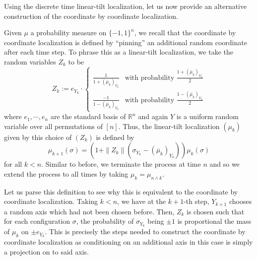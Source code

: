 Using the discrete time linear-tilt localization, let us now provide an alternative construction of the 
coordinate by coordinate localization.

Given \(\mu\) a probability measure on \(\{-1, 1\}^n\), we recall that the coordinate by coordinate 
localization is defined by ``pinning'' an additional random coordinate after each time step. To phrase 
this as a linear-tilt localization, we take the random variables \(Z_k\) to be
\begin{equation}
  Z_k := e_{Y_k} \cdot
    \begin{cases}
      \frac{1}{1 + (\bar{\mu}_k)_{Y_k}} & \text{with probability } \frac{1 + (\bar{\mu}_k)_{Y_k}}{2} \\
      \frac{-1}{1 - (\bar{\mu}_k)_{Y_k}} & \text{with probability } \frac{1 - (\bar{\mu}_k)_{Y_k}}{2}
    \end{cases}
\end{equation}
where \(e_1, \cdots, e_n\) are the standard basis of \(\mathbb{R}^n\) and again \(Y\) is a uniform 
random variable over all permutations of \([n]\). Thus, the linear-tilt localization \((\mu_k)\) given by this 
choice of \((Z_k)\) is defined by
\[\mu_{k + 1}(\sigma) = (1 + \|Z_k\|(\sigma_{Y_k} - (\overline{\mu}_k)_{Y_k}))\mu_k(\sigma)\]
for all \(k < n\). Similar to before, we terminate the process at time \(n\) and so we extend the process 
to all times by taking \(\mu_k = \mu_{n \wedge k}\).

Let us parse this definition to see why this is equivalent to the coordinate by coordinate localization. 
Taking \(k < n\), we have at the \(k + 1\)-th step, \(Y_{k + 1}\) chooses a random axis
which had not been chosen before. Then, \(Z_k\) is chosen such that for each configuration \(\sigma\), 
the probability of \(\sigma_{Y_k}\) being \(\pm 1\) is proportional the mass of \(\mu_k\) on \(\pm e_{Y_k}\). 
This is precisely the steps needed to construct the coordinate by coordinate localization as conditioning 
on an additional axis in this case is simply a projection on to said axis. 